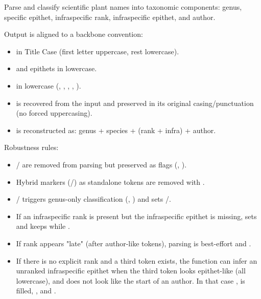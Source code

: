 \documentclass[a4paper]{book}
\begin{document}
%
\begin{Description}
\strong{[Stable]}

Parse and classify scientific plant names into taxonomic components:
genus, specific epithet, infraspecific rank, infraspecific epithet, and author.

Output is aligned to a backbone convention:
\begin{itemize}

\item{}  in Title Case (first letter uppercase, rest lowercase).
\item{}  and  epithets in lowercase.
\item{}  in lowercase (, , , , ).
\item{}  is recovered from the input and preserved in its original
casing/punctuation (no forced uppercasing).
\item{}  is reconstructed as: genus + species + (rank + infra) + author.

\end{itemize}


Robustness rules:
\begin{itemize}

\item{}  /  are removed from parsing but preserved as flags (, ).
\item{} Hybrid markers (/) as standalone tokens are removed with .
\item{}  /  triggers genus-only classification (, )
and sets /.
\item{} If an infraspecific rank is present but the infraspecific epithet is missing,
sets  and keeps  while .
\item{} If rank appears "late" (after author-like tokens), parsing is best-effort and
.
\item{} If there is no explicit rank and a third token exists, the function can infer an
unranked infraspecific epithet when the third token looks epithet-like (all lowercase),
and does not look like the start of an author. In that case ,
 is filled, , and .

\end{itemize}

\end{Description}
\end{document}
